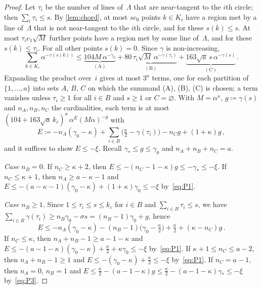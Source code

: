 \documentclass[11pt,letterpaper]{article}
\begin{document}
\begin{proof}
Let $\tau_i$ be the number of lines of~$\Lambda$ that are near-tangent to the $i$th circle; then $\sum_i\tau_i\le s$. By \cref{lem:chord}, at most $sc_0$ points $k\in K_i$ have a region met by a line of~$\Lambda$ that is not near-tangent to the $i$th circle, and for these $s(k)\le s$. At most $\tau_ic_1\sqrt M$ further points have a region met by some line of~$\Lambda$, and for these $s(k)\le\tau_i$. For all other points $s(k)=0$. Since $\gamma$ is non-increasing,
\begin{equation*}
  \sum_{k\in K_i}\alpha^{-\gamma(s(k))}\le\underbrace{104M\,\alpha^{-\gamma_0}}_{\mathrm{(A)}}+\underbrace{80\,\tau_i\sqrt M\,\alpha^{-\gamma(\tau_i)}}_{\mathrm{(B)}}+\underbrace{163\sqrt a\,s\,\alpha^{-\gamma(s)}}_{\mathrm{(C)}}\,.
\end{equation*}
Expanding the product over~$i$ gives at most $3^a$ terms, one for each partition of $\{1,\dots,a\}$ into sets $A$, $B$, $C$ on which the summand (A), (B), (C) is chosen; a term vanishes unless $\tau_i\ge1$ for all $i\in B$ and $s\ge1$ or $C=\varnothing$. With $M=\alpha^\kappa$, $g\coloneqq\gamma(s)$ and $n_A,n_B,n_C$ the cardinalities, each term is at most $(104+163\sqrt a\,k_c)^a\,\alpha^{E}(M\alpha)^{-g}$ with
\begin{equation*}
  E\coloneqq-n_A(\gamma_0-\kappa)+\sum_{i\in B}\bigl(\tfrac\kappa2-\gamma(\tau_i)\bigr)-n_Cg+(1+\kappa)g\,,
\end{equation*}
and it suffices to show $E\le-\xi$. Recall $\gamma_*\le g\le\gamma_0$ and $n_A+n_B+n_C=a$.

\emph{Case $n_B=0$.} If $n_C\ge\kappa+2$, then $E\le-(n_C-1-\kappa)g\le-\gamma_*\le-\xi$. If $n_C\le\kappa+1$, then $n_A\ge a-\kappa-1$ and $E\le-(a-\kappa-1)(\gamma_0-\kappa)+(1+\kappa)\gamma_0\le-\xi$ by~\eqref{eq:P1}.

\emph{Case $n_B\ge1$.} Since $1\le\tau_i\le s\le k_c$ for $i\in B$ and $\sum_{i\in B}\tau_i\le s$, we have $\sum_{i\in B}\gamma(\tau_i)\ge n_B\gamma_0-\sigma s=(n_B-1)\gamma_0+g$, hence
\begin{equation*}
  E\le-n_A(\gamma_0-\kappa)-(n_B-1)\bigl(\gamma_0-\tfrac\kappa2\bigr)+\tfrac\kappa2+(\kappa-n_C)g\,.
\end{equation*}
If $n_C\le\kappa$, then $n_A+n_B-1\ge a-1-\kappa$ and $E\le-(a-1-\kappa)(\gamma_0-\kappa)+\frac\kappa2+\kappa\gamma_0\le-\xi$ by~\eqref{eq:P1}. If $\kappa+1\le n_C\le a-2$, then $n_A+n_B-1\ge1$ and $E\le-(\gamma_0-\kappa)+\frac\kappa2\le-\xi$ by~\eqref{eq:P1}. If $n_C=a-1$, then $n_A=0$, $n_B=1$ and $E\le\frac\kappa2-(a-1-\kappa)g\le\frac\kappa2-(a-1-\kappa)\gamma_*\le-\xi$ by~\eqref{eq:P3}.
\end{proof}
\end{document}
